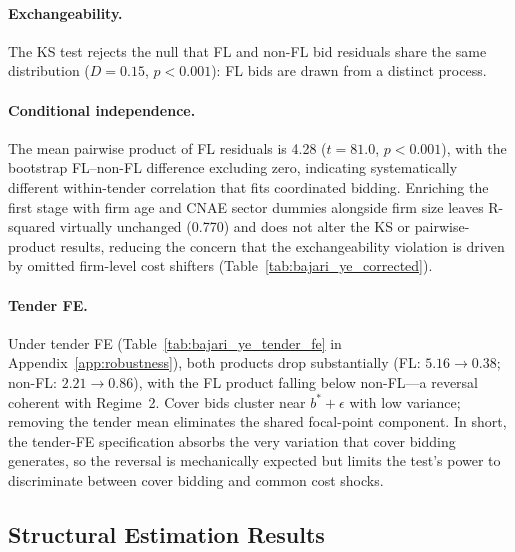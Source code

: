 \paragraph{Exchangeability.}
The KS test rejects the null that FL and non-FL bid residuals share
the same distribution ($D = 0.15$, $p < 0.001$): FL bids are drawn
from a distinct process.

\paragraph{Conditional independence.}
The mean pairwise product of FL residuals is 4.28 ($t = 81.0$,
$p < 0.001$), with the bootstrap FL--non-FL difference
excluding zero, indicating systematically different within-tender
correlation that fits coordinated bidding. Enriching the
first stage with firm age and CNAE sector dummies alongside firm
size leaves R-squared virtually unchanged (0.770) and does not
alter the KS or pairwise-product results, reducing the concern
that the exchangeability violation is driven by omitted firm-level
cost shifters (Table~\ref{tab:bajari_ye_corrected}).

\paragraph{Tender FE.}
Under tender FE (Table~\ref{tab:bajari_ye_tender_fe} in
Appendix~\ref{app:robustness}), both products drop substantially
(FL: $5.16 \to 0.38$; non-FL: $2.21 \to 0.86$), with the FL product
falling below non-FL---a reversal coherent with Regime~2. Cover bids
cluster near $b^* + \epsilon$ with low variance; removing the tender
mean eliminates the shared focal-point component. In short, the tender-FE specification absorbs the very
variation that cover bidding generates, so the reversal is
mechanically expected but limits the test's power to discriminate
between cover bidding and common cost shocks.




\subsection{Structural Estimation Results}
\label{sec:results_structural}

